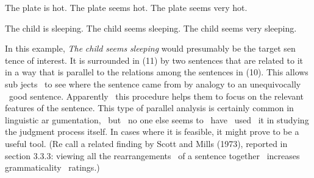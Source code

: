 \clearpage\setcounter{page}{1}\setcounter{listWWNumxxviiileveli}{9}
\begin{listWWNumxxviiileveli}
\item 
\begin{styleStandard}
The plate is hot. The plate seems hot. The plate seems very hot.
\end{styleStandard}


\end{listWWNumxxviiileveli}
\begin{listWWNumxxviiileveli}
\item 
\begin{styleStandard}
The child is sleeping. The child seems sleeping. The child seems very sleeping.
\end{styleStandard}


\end{listWWNumxxviiileveli}
\begin{styleStandard}
In this example, \textit{The}\textit{ }\textit{child}\textit{ }\textit{seems}\textit{ }\textit{sleeping}\textit{ }would presumably be the target sen\- tence of interest. It is surrounded in (11) by two sentences that are related to it in a way that is parallel to the relations among the sentences in (10). This allows sub\- jects \ to see where the sentence came from by analogy to an unequivocally \ good sentence. Apparently \ this procedure helps them to focus on the relevant features of the sentence. This type of parallel analysis is certainly common in linguistic ar\- gumentation, \ but \ no one else seems to \ have \ used \ it in studying the judgment process itself. In cases where it is feasible, it might prove to be a useful tool. (Re\- call a related finding by Scott and Mills (1973), reported in section 3.3.3: viewing all the rearrangements \ of a sentence together \ increases grammaticality \ ratings.)
\end{styleStandard}


